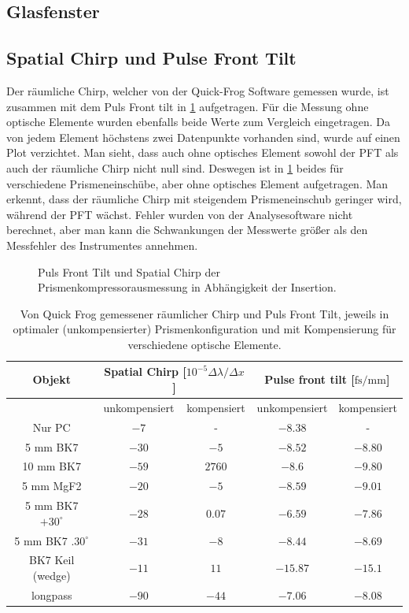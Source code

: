 \documentclass[twoside,        %
               BCOR12mm,       %
               english,ngerman, %
               fleqn,headsepline=false,footsepline=false
              ]{Vorlage/MFPREPORT}
\begin{document}
\subsection{Glasfenster}
\subsection{Spatial Chirp und Pulse Front Tilt}
Der räumliche Chirp, welcher von der Quick-Frog Software gemessen wurde, ist
zusammen mit dem Puls Front tilt in \cref{tab:pft} aufgetragen. Für die Messung
ohne optische Elemente wurden ebenfalls beide Werte zum Vergleich eingetragen. 
Da von jedem Element höchstens zwei Datenpunkte vorhanden sind, wurde auf einen
Plot verzichtet. Man sieht, dass auch ohne optisches Element sowohl der PFT als
auch der räumliche Chirp nicht null sind. Deswegen ist in \cref{fig:pcpft}
beides für verschiedene Prismeneinschübe, aber ohne optisches Element
aufgetragen. Man erkennt, dass der räumliche Chirp mit steigendem
Prismeneinschub geringer wird, während der PFT wächst. Fehler wurden von der Analysesoftware nicht berechnet, aber man
kann die Schwankungen der Messwerte größer als den Messfehler des Instrumentes
annehmen.
\begin{figure}[]
    \begin{center}
        
    \end{center}
    \caption{Puls Front Tilt und Spatial Chirp der Prismenkompressorausmessung
    in Abhängigkeit der Insertion.}
    \label{fig:pcpft}
\end{figure}

\begin{table}
    \centering
    \begin{tabular}[]{|c||c|c||c|c|}
        \hline
        Objekt&\multicolumn{2}{|c||}{Spatial Chirp [$10^{-5}\Delta\lambda/\Delta x$]}&\multicolumn{2}{|c|}{Pulse front tilt [$\text{fs}/\text{mm}$]}\\\hline
         &unkompensiert&kompensiert&unkompensiert&kompensiert\\ 
        \hline
        Nur PC&$-7$&-&$-8.38$&-\\\hline
        5 mm BK7&$-30$&$-5$&$-8.52$&$-8.80$\\\hline
        10 mm BK7&$-59$&$2760$&$-8.6$&$-9.80$\\\hline
        5 mm MgF2&$-20$&$-5$&$-8.59$&$-9.01$\\\hline
        5 mm BK7 $+30^\circ$&$-28$&$0.07$&$-6.59$&$-7.86$\\\hline
        5 mm BK7 $.30^\circ$&$-31$&$-8$&$-8.44$&$-8.69$\\\hline
        BK7 Keil (wedge)&$-11$&$11$&$-15.87$&$-15.1$\\\hline
        longpass&$-90$&$-44$&$-7.06$&$-8.08$\\\hline
    \end{tabular}
    \caption{Von Quick Frog gemessener räumlicher Chirp und Puls Front Tilt,
    jeweils in optimaler (unkompensierter) Prismenkonfiguration und mit
    Kompensierung für verschiedene optische Elemente.}
    \label{tab:pft}
\end{table}
\end{document}
